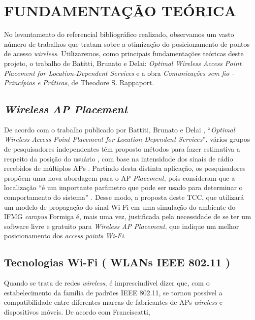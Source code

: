 \documentclass[
	12pt,				%
	twoside,			%
	a4paper,			%
	english,			%
	french,				%
	spanish,			%
	brazil				%
	]{abntex2}
\begin{document}
\chapter{FUNDAMENTAÇÃO TEÓRICA}\label{fundamentauxe7uxe3o-teuxf3rica}

No levantamento do referencial bibliográfico realizado, observamos um
vasto número de trabalhos que tratam sobre a otimização do
posicionamento de pontos de acesso \emph{wireless}. Utilizaremos, como
principais fundamentações teóricas deste projeto, o trabalho de Batitti,
Brunato e Delai: \emph{Optimal Wireless Access Point Placement for
Location-Dependent Services} e a obra \emph{Comunicações sem fio -
Princípios e Práticas}, de Theodore S. Rappaport.

\section{\texorpdfstring{\emph{Wireless AP
Placement}}{Wireless AP Placement}}\label{wireless-ap-placement}

De acordo com o trabalho publicado por Battiti, Brunato e Delai
\cite{BATTITI}, ``\emph{Optimal Wireless Access Point Placement for
Location-Dependent Services}'', vários grupos de pesquisadores
independentes têm proposto métodos para fazer estimativa a respeito da
posição do usuário \cite{DALSSOTO}, com base na intensidade dos sinais
de rádio recebidos de múltiplos APs \cite{NAJNUDEL}. Partindo desta
distinta aplicação, os pesquisadores propõem uma nova abordagem para o
AP \emph{Placement}, pois consideram que a localização ``é um importante
parâmetro que pode ser usado para determinar o comportamento do
sistema'' \cite[p. 1]{BATTITI}. Desse modo, a proposta deste TCC, que
utilizará um modelo de propagação do sinal Wi-Fi em uma simulação do
ambiente do IFMG \emph{campus} Formiga é, mais uma vez, justificada pela
necessidade de se ter um software livre e gratuito para \emph{Wireless
AP Placement}, que indique um melhor posicionamento dos \emph{access
points Wi-Fi}.

\section{Tecnologias Wi-Fi ( WLANs IEEE 802.11
)}\label{tecnologias-wi-fi-wlans-ieee-802.11}

Quando se trata de redes \emph{wireless}, é imprescindível dizer que,
com o estabelecimento da família de padrões IEEE 802.11, se tornou
possível a compatibilidade entre diferentes marcas de fabricantes de APs
\emph{wireless} e dispositivos móveis. De acordo com Franciscatti,
\end{document}
